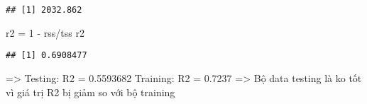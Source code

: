 \documentclass[
]{article}
\newenvironment{Shaded}{\begin{snugshade}}{\end{snugshade}}
\newcommand{\DecValTok}[1]{\textcolor[rgb]{0.00,0.00,0.81}{#1}}
\newcommand{\NormalTok}[1]{#1}
\newcommand{\OtherTok}[1]{\textcolor[rgb]{0.56,0.35,0.01}{#1}}
\newcommand{\SpecialCharTok}[1]{\textcolor[rgb]{0.00,0.00,0.00}{#1}}
\begin{document}
\begin{verbatim}
## [1] 2032.862
\end{verbatim}

\begin{Shaded}
\begin{Highlighting}[]
\NormalTok{r2 }\OtherTok{=} \DecValTok{1} \SpecialCharTok{{-}}\NormalTok{ rss}\SpecialCharTok{/}\NormalTok{tss}
\NormalTok{r2}
\end{Highlighting}
\end{Shaded}

\begin{verbatim}
## [1] 0.6908477
\end{verbatim}

=\textgreater{} Testing: R2 = 0.5593682 Training: R2 = 0.7237
=\textgreater{} Bộ data testing là ko tốt vì giá trị R2 bị giảm so với
bộ training
\end{document}
